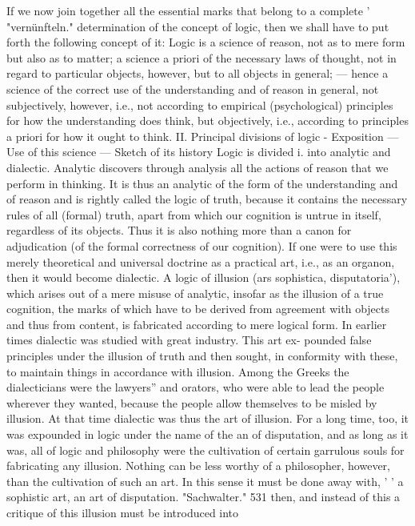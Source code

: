 If we now join together all the essential marks that belong to a complete
'
"vernünfteln."
determination of the concept of logic, then we shall have to put forth the
following concept of it:
Logic is a science of reason, not as to mere form but also as to matter; a
science a priori of the necessary laws of thought, not in regard to particular
objects, however, but to all objects in general; — hence a science of the correct use
of the understanding and of reason in general, not subjectively,
however, i.e.,
not according to empirical (psychological) principles for how the understanding
does think, but objectively, i.e., according to principles a priori for how it ought
to think.
II.
Principal divisions of logic - Exposition — Use of this science — Sketch
of its history
Logic is divided
i.
into analytic and dialectic.
Analytic discovers through analysis all the actions of reason that we
perform in thinking. It is thus an analytic of the form of the understanding
and of reason and is rightly called the logic of truth, because it contains
the necessary rules of all (formal) truth, apart from which our cognition is
untrue in itself, regardless of its objects. Thus it is also nothing more than
a canon for adjudication (of the formal correctness of our cognition).
If one were to use this merely theoretical and universal doctrine as a
practical art, i.e., as an organon, then it would become dialectic. A logic of
illusion (ars sophistica, disputatoria'), which arises out of a mere misuse of
analytic, insofar as the illusion of a true cognition, the marks of which
have to be derived from agreement with objects and thus from content, is
fabricated according to mere logical form.
In earlier times dialectic was studied with great industry. This art ex-
pounded false principles under the illusion of truth and then sought, in
conformity with these, to maintain things in accordance with illusion.
Among the Greeks the dialecticians were the lawyers'' and orators, who
were able to lead the people wherever they wanted, because the people
allow themselves to be misled by illusion. At that time dialectic was thus
the art of illusion. For a long time, too, it was expounded in logic under
the name of the an of disputation, and as long as it was, all of logic and
philosophy were the cultivation of certain garrulous souls for fabricating
any illusion. Nothing can be less worthy of a philosopher, however, than
the cultivation of such an art. In this sense it must be done away with,
'
'
a sophistic art, an art of disputation.
"Sachwalter."
531
then, and instead of this a critique of this illusion must be introduced into
